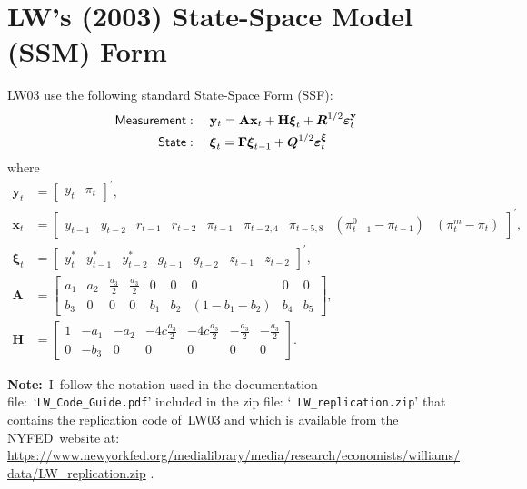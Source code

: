 \documentclass[a4paper,12pt]{article}
\begin{document}
\section{LW's (2003) State-Space Model (SSM) Form}

LW03 use the following standard State-Space Form (SSF):%
\begin{align*}
\mathsf{Measurement}& :\quad \mathbf{y}_{t}=\mathbf{Ax}_{t}+\mathbf{H}%
\boldsymbol{\xi }_{t}+\boldsymbol{R}^{1/2}\boldsymbol{\varepsilon }_{t}^{%
\mathbf{y}} \\
\mathsf{State}& :\quad \boldsymbol{\xi }_{t}=\mathbf{F}\boldsymbol{\xi }%
_{t-1}+\boldsymbol{Q}^{1/2}\boldsymbol{\varepsilon }_{t}^{\boldsymbol{\xi }}
\end{align*}%
where%
\begin{align*}
\mathbf{y}_{t}& =%
\begin{bmatrix}
y_{t} & \pi _{t}%
\end{bmatrix}%
^{\prime }, \\
\mathbf{x}_{t}& =%
\begin{bmatrix}
y_{t-1} & y_{t-2} & r_{t-1} & r_{t-2} & \pi _{t-1} & \pi _{t-2,4} & \pi
_{t-5,8} & \left( \pi _{t-1}^{0}-\pi _{t-1}\right) & \left( \pi _{t}^{m}-\pi
_{t}\right)%
\end{bmatrix}%
^{\prime }, \\
\boldsymbol{\xi }_{t}& =%
\begin{bmatrix}
y_{t}^{\ast } & y_{t-1}^{\ast } & y_{t-2}^{\ast } & g_{t-1} & g_{t-2} &
z_{t-1} & z_{t-2}%
\end{bmatrix}%
^{\prime }, \\
\mathbf{A}& =%
\begin{bmatrix}
a_{1} & a_{2} & \frac{a_{3}}{2} & \frac{a_{3}}{2} & 0 & 0 & 0 & 0 & 0 \\
b_{3} & 0 & 0 & 0 & b_{1} & b_{2} & \left( 1-b_{1}-b_{2}\right) & b_{4} &
b_{5}%
\end{bmatrix}%
, \\
\mathbf{H}& =%
\begin{bmatrix}
1 & -a_{1} & -a_{2} & -4c\frac{a_{3}}{2} & -4c\frac{a_{3}}{2} & -\frac{a_{3}%
}{2} & -\frac{a_{3}}{2} \\
0 & -b_{3} & 0 & 0 & 0 & 0 & 0%
\end{bmatrix}%
.
\end{align*}

\noindent \textbf{Note:}\ I\ follow the notation used in the documentation
file:\ `\texttt{LW\_Code\_Guide.pdf}' included in the zip file: `\texttt{%
LW\_replication.zip}' that contains the replication code of\ LW03 and which
is available from the NYFED\ website at: %
\url{https://www.newyorkfed.org/medialibrary/media/research/economists/williams/data/LW\_replication.zip}%
.
\end{document}
